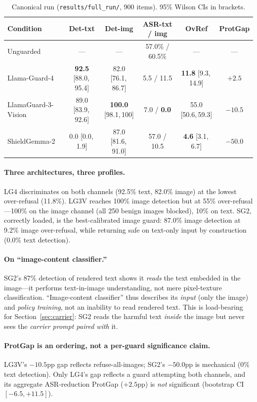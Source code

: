 \documentclass[11pt]{article}
\begin{document}
\begin{table}[t]
\centering
\caption{Canonical run (\texttt{results/full\_run/}, 900 items). 95\% Wilson CIs in brackets.}
\label{tab:main}
\small
\begin{tabular}{lccccc}
\toprule
Condition & Det-txt & Det-img & ASR-txt / img & OvRef & ProtGap \\
\midrule
Unguarded & --- & --- & 57.0\% / 60.5\% & --- & --- \\
Llama-Guard-4 & \textbf{92.5} [88.0,\,95.4] & 82.0 [76.1,\,86.7] & 5.5 / 11.5 & \textbf{11.8} [9.3,\,14.9] & $+2.5$ \\
LlamaGuard-3-Vision & 89.0 [83.9,\,92.6] & \textbf{100.0} [98.1,\,100] & 7.0 / \textbf{0.0} & 55.0 [50.6,\,59.3] & $-10.5$ \\
ShieldGemma-2 & 0.0 [0.0,\,1.9] & 87.0 [81.6,\,91.0] & 57.0 / 10.5 & \textbf{4.6} [3.1,\,6.7] & $-50.0$ \\
\bottomrule
\end{tabular}
\end{table}

\paragraph{Three architectures, three profiles.} LG4 discriminates on both channels (92.5\% text, 82.0\% image) at the lowest over-refusal (11.8\%). LG3V reaches 100\% image detection but at 55\% over-refusal---100\% on the image channel (all 250 benign images blocked), 10\% on text. SG2, correctly loaded, is the best-calibrated image guard: 87.0\% image detection at 9.2\% image over-refusal, while returning safe on text-only input by construction (0.0\% text detection).

\paragraph{On ``image-content classifier.''} SG2's 87\% detection of rendered text shows it \emph{reads} the text embedded in the image---it performs text-in-image understanding, not mere pixel-texture classification. ``Image-content classifier'' thus describes its \emph{input} (only the image) and \emph{policy training}, not an inability to read rendered text. This is load-bearing for Section~\ref{sec:carrier}: SG2 reads the harmful text \emph{inside} the image but never sees the \emph{carrier prompt paired with} it.

\paragraph{ProtGap is an ordering, not a per-guard significance claim.} LG3V's $-10.5$pp gap reflects refuse-all-images; SG2's $-50.0$pp is mechanical (0\% text detection). Only LG4's gap reflects a guard attempting both channels, and its aggregate ASR-reduction ProtGap ($+2.5$pp) is \emph{not} significant (bootstrap CI $[-6.5,+11.5]$).
\end{document}
